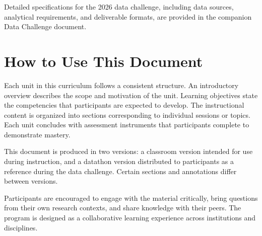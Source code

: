 Detailed specifications for the 2026 data challenge, including data sources, analytical requirements, and deliverable formats, are provided in the companion Data Challenge document.

\section*{How to Use This Document}
\label{sec:intro-howto}

Each unit in this curriculum follows a consistent structure. An introductory overview describes the scope and motivation of the unit. Learning objectives state the competencies that participants are expected to develop. The instructional content is organized into sections corresponding to individual sessions or topics. Each unit concludes with assessment instruments that participants complete to demonstrate mastery.

This document is produced in two versions: a classroom version intended for use during instruction, and a datathon version distributed to participants as a reference during the data challenge. Certain sections and annotations differ between versions.

\bigskip
\noindent Participants are encouraged to engage with the material critically, bring questions from their own research contexts, and share knowledge with their peers. The program is designed as a collaborative learning experience across institutions and disciplines.